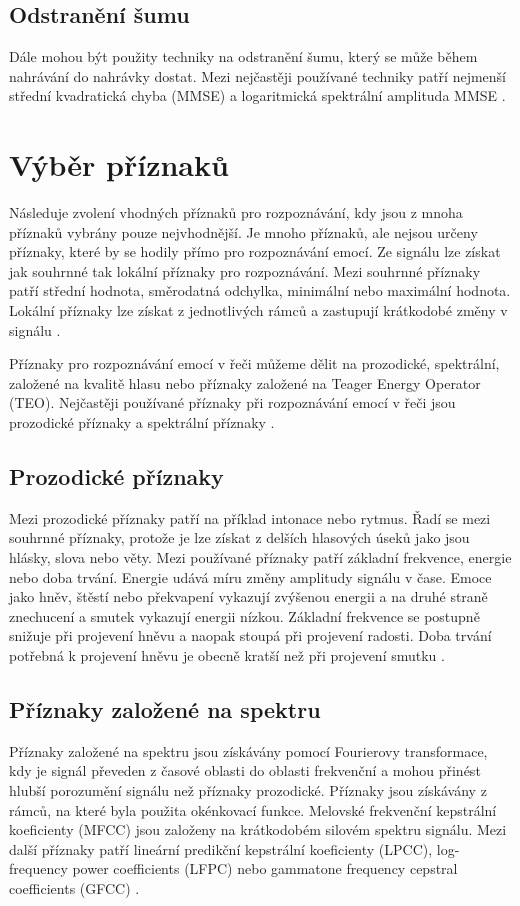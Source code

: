 \documentclass[FM,BP]{tulthesis}
\begin{document}
\subsection{Odstranění šumu} %
Dále mohou být použity techniky na odstranění šumu, který se může během nahrávání do nahrávky dostat. Mezi nejčastěji používané techniky patří nejmenší střední kvadratická chyba (MMSE) a logaritmická spektrální amplituda MMSE \cite{DBLP:journals/speech/AkcayO20}.

\section{Výběr příznaků} %
Následuje zvolení vhodných příznaků pro rozpoznávání, kdy jsou z mnoha příznaků vybrány pouze nejvhodnější. Je mnoho příznaků, ale nejsou určeny příznaky, které by se hodily přímo pro rozpoznávání emocí. Ze signálu lze získat jak souhrnné tak lokální příznaky pro rozpoznávání. Mezi souhrnné  příznaky patří střední hodnota, směrodatná odchylka, minimální nebo maximální hodnota. Lokální příznaky lze získat z jednotlivých rámců a zastupují krátkodobé změny v signálu \cite{DBLP:journals/speech/AkcayO20}.

Příznaky pro rozpoznávání emocí v řeči můžeme dělit na prozodické, spektrální, založené na kvalitě hlasu nebo příznaky založené na Teager Energy Operator (TEO). Nejčastěji používané příznaky při rozpoznávání emocí v řeči jsou prozodické příznaky a spektrální příznaky \cite{DBLP:journals/speech/AkcayO20}.

\subsection{Prozodické příznaky}  %
Mezi prozodické příznaky patří na příklad intonace nebo rytmus. Řadí se mezi souhrnné příznaky, protože je lze získat z delších hlasových úseků jako jsou hlásky, slova nebo věty. Mezi používané příznaky patří základní frekvence, energie nebo doba trvání. Energie udává míru změny amplitudy signálu v čase. Emoce jako hněv, štěstí nebo překvapení vykazují zvýšenou energii a na druhé straně znechucení a smutek vykazují energii nízkou. Základní frekvence se postupně snižuje při projevení hněvu a naopak stoupá při projevení radosti. Doba trvání potřebná k projevení hněvu je obecně kratší než při projevení smutku \cite{DBLP:journals/speech/AkcayO20}.

\subsection{Příznaky založené na spektru}  %
Příznaky založené na spektru jsou získávány pomocí Fourierovy transformace, kdy je signál převeden z časové oblasti do oblasti frekvenční a mohou přinést hlubší porozumění signálu než příznaky prozodické. Příznaky jsou získávány z rámců, na které byla použita okénkovací funkce. Melovské frekvenční kepstrální koeficienty (MFCC) jsou založeny na krátkodobém silovém spektru signálu. Mezi další příznaky patří lineární predikční kepstrální koeficienty (LPCC), log-frequency power coefficients (LFPC) nebo gammatone frequency cepstral coefficients (GFCC) \cite{DBLP:journals/speech/AkcayO20}.
\end{document}
